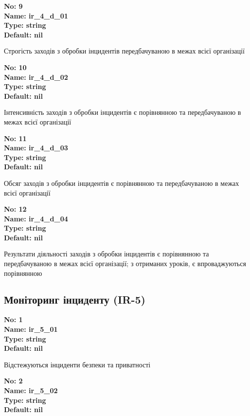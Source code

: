 \documentclass{article}
\begin{document}
{\footnotesize\bfseries
No: 9\\
Name: ir\_\allowbreak{}4\_\allowbreak{}d\_\allowbreak{}01\\
Type: string\\
Default: nil
}

{\footnotesize Строгість заходів з обробки інцидентів передбачуваною в межах всієї організації}


{\footnotesize\bfseries
No: 10\\
Name: ir\_\allowbreak{}4\_\allowbreak{}d\_\allowbreak{}02\\
Type: string\\
Default: nil
}

{\footnotesize Інтенсивність заходів з обробки інцидентів є порівнянною та передбачуваною в межах всієї організації}


{\footnotesize\bfseries
No: 11\\
Name: ir\_\allowbreak{}4\_\allowbreak{}d\_\allowbreak{}03\\
Type: string\\
Default: nil
}

{\footnotesize Обсяг заходів з обробки інцидентів є порівнянною та передбачуваною в межах всієї організації}


{\footnotesize\bfseries
No: 12\\
Name: ir\_\allowbreak{}4\_\allowbreak{}d\_\allowbreak{}04\\
Type: string\\
Default: nil
}

{\footnotesize Результати діяльності заходів з обробки інцидентів є порівнянною та передбачуваною в межах всієї організації; з отриманих уроків, є впроваджуються порівнянною}




\subsection{Моніторинг інциденту (IR-5)}


\vspace{10pt}
{\footnotesize\bfseries
No: 1\\
Name: ir\_\allowbreak{}5\_\allowbreak{}01\\
Type: string\\
Default: nil
}

{\footnotesize Відстежуються інциденти безпеки та приватності}


{\footnotesize\bfseries
No: 2\\
Name: ir\_\allowbreak{}5\_\allowbreak{}02\\
Type: string\\
Default: nil
}
\end{document}
